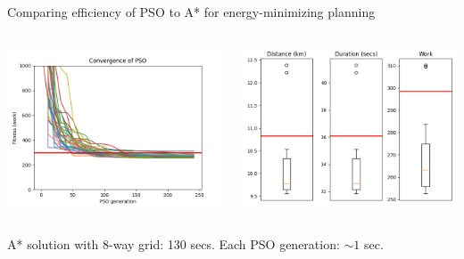 \documentclass[9pt,xcolor=table]{beamer}
\begin{document}
\begin{frame}{Comparing efficiency of PSO to A* for energy-minimizing planning}
\begin{columns}
        \begin{column}{0.5\textwidth}
            \includegraphics[width=\textwidth,trim={0cm 0cm 0cm 0cm},clip]{img/FP2_convergence.png}
        \end{column}
        \begin{column}{0.5\textwidth}
            \includegraphics[width=\textwidth,trim={0cm 0cm 0cm 0cm},clip]{img/FP2_box.png}
        \end{column}
    \end{columns}
    {\tiny A* solution with 8-way grid: 130 secs. Each PSO generation: $\sim 1$ sec.}
        
\end{frame}
\end{document}
